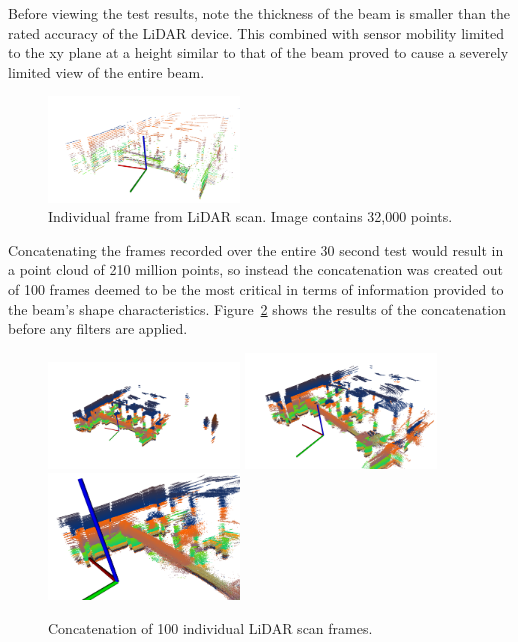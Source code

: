 \documentclass[12pt]{drexelthesis}
\begin{document}
Before viewing the test results, note the thickness of the beam is smaller than the rated accuracy of the LiDAR device. This combined with sensor mobility limited to the xy plane at a height similar to that of the beam proved to cause a severely limited view of the entire beam.


\begin{figure}[!ht]
	\centering
		\includegraphics[width=2in]{cloudCollection/lidar5frames.png}
		\caption[Individual LiDAR scan frame]{\centering Individual frame from LiDAR scan. Image contains 32,000 points.}
	\label{lidarresults:singlescan}
\end{figure}

Concatenating the frames recorded over the entire 30 second test would result in a point cloud of 210 million points, so instead the concatenation was created out of 100 frames deemed to be the most critical in terms of information provided to the beam's shape characteristics. Figure~\ref{lidarresults:concatenated} shows the results of the concatenation before any filters are applied.


\begin{figure}[!ht]
	\centering
		\includegraphics[width=2in]{images/real-lab-scans/rawscan0.png}
		\includegraphics[width=2in]{images/real-lab-scans/rawscan1.png}
		\includegraphics[width=2in]{images/real-lab-scans/rawscan2.png}
		\caption[Concatenation of 100 individual LiDAR scan frames]{\centering Concatenation of 100 individual LiDAR scan frames.}
	\label{lidarresults:concatenated}
\end{figure}
\end{document}

